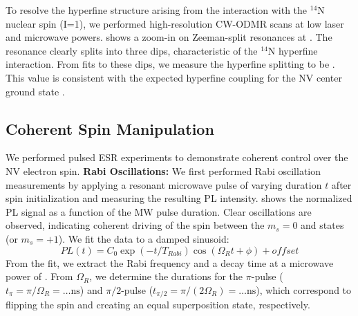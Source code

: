 \documentclass[aps,prb,twocolumn,superscriptaddress,floatfix,longbibliography,citeautoscript]{revtex4-2}
\begin{document}
To resolve the hyperfine structure arising from the interaction with the $^{14}$N nuclear spin (I=1), we performed high-resolution CW-ODMR scans at low laser and microwave powers.
 shows a zoom-in on  Zeeman-split resonances at . 
The resonance clearly splits into three dips, characteristic of the $^{14}$N hyperfine interaction.
From fits to these dips, we measure the hyperfine splitting to be .
This value is consistent with the expected hyperfine coupling for the NV center ground state . %

\subsection{\label{sec:results_coherent}Coherent Spin Manipulation}
We performed pulsed ESR experiments to demonstrate coherent control over the NV electron spin.
\textbf{Rabi Oscillations:} We first performed Rabi oscillation measurements by applying a resonant microwave pulse of varying duration $t$ after spin initialization and measuring the resulting PL intensity.
 shows the normalized PL signal as a function of the MW pulse duration.
Clear oscillations are observed, indicating coherent driving of the spin between the $m_s=0$ and  states (or $m_s=+1$).
We fit the data to a damped sinusoid:
\begin{equation}
    PL(t) = C_0 \exp(-t/T_{Rabi}) \cos(\Omega_R t + \phi) + offset %
    \label{eq:rabi_fit}
\end{equation}
From the fit, we extract the Rabi frequency  and a decay time  
at a microwave power of . 
From $\Omega_R$, we determine the durations for the $\pi$-pulse ($t_\pi = \pi / \Omega_R = \dots \si{\nano\second}$) and $\pi/2$-pulse ($t_{\pi/2} = \pi / (2\Omega_R) = \dots \si{\nano\second}$), which correspond to flipping the spin and creating an equal superposition state, respectively.
\end{document}
